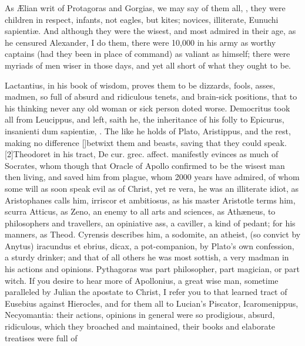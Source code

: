 {As \AE{}lian writ of Protagoras and Gorgias, we may say of them all,
, they were
children in respect, infants, not eagles, but kites; novices,
illiterate, Eunuchi sapienti\ae{}. And although they were the wisest, and
most admired in their age, as he censured Alexander, I do them, there
were 10,000 in his army as worthy captains (had they been in place of
command) as valiant as himself; there were myriads of men wiser in
those days, and yet all short of what they ought to be.

Lactantius, in his book of wisdom, proves them to be dizzards,
fools, asses, madmen, so full of absurd and ridiculous tenets, and
brain-sick positions, that to his thinking never any old woman or sick
person doted worse. Democritus took all from Leucippus, and left,
saith he, the inheritance of his folly to Epicurus, insanienti dum
sapienti\ae{}, \etc. The like he holds of Plato, Aristippus, and the rest,
making no difference [\baselineskip]betwixt them and beasts, saving that they
could speak. [2\baselineskip]Theodoret in his tract, De cur. grec. affect.
manifestly evinces as much of Socrates, whom though that Oracle of
Apollo confirmed to be the wisest man then living, and saved him from
plague, whom 2000 years have admired, of whom some will as soon speak
evil as of Christ, yet re vera, he was an illiterate idiot, as
Aristophanes calls him, irriscor et ambitiosus, as his master
Aristotle terms him, scurra Atticus, as Zeno, an enemy to all arts
and sciences, as Ath\ae{}neus, to philosophers and travellers, an
opiniative ass, a caviller, a kind of pedant; for his manners, as
Theod. Cyrensis describes him, a  sodomite, an atheist, (so
convict by Anytus) iracundus et ebrius, dicax, \etc a pot-companion, by
Plato's own confession, a sturdy drinker; and that of all others
he was most sottish, a very madman in his actions and opinions.
Pythagoras was part philosopher, part magician, or part witch. If you
desire to hear more of Apollonius, a great wise man, sometime
paralleled by Julian the apostate to Christ, I refer you to that
learned tract of Eusebius against Hierocles, and for them all to
Lucian's Piscator, Icaromenippus, Necyomantia: their actions, opinions
in general were so prodigious, absurd, ridiculous, which they broached
and maintained, their books and elaborate treatises were full of
}
